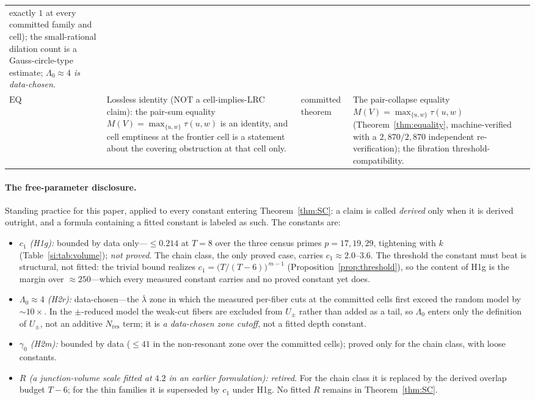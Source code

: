 \documentclass[11pt,a4paper]{article}
\numberwithin{equation}{section}
\theoremstyle{plain}
\theoremstyle{plain}
\theoremstyle{definition}
\theoremstyle{remark}
\begin{document}
{\begin{longtable}{@{}p{}p{}
                   p{}p{}@{}}
exactly $1$ at every committed family and cell); the small-rational
dilation count is a Gauss-circle-type estimate;
\emph{$\Lambda_0\approx 4$ is data-chosen}. \\
$\mathrm{EQ}$ &
Lossless identity (NOT a cell-implies-LRC claim): the pair-sum equality
$M(V)=\max_{\{u,w\}}\tau(u,w)$ is an identity, and cell emptiness at the
frontier cell is a statement about the covering obstruction at that cell
only. &
committed theorem &
The pair-collapse equality
$M(V)=\max_{\{u,w\}}\tau(u,w)$ (Theorem~\ref{thm:equality},
machine-verified with a $2{,}870/2{,}870$ independent re-verification);
the fibration threshold-compatibility. \\
\end{longtable}
}

\paragraph{The free-parameter disclosure.}
Standing practice for this paper, applied to every constant entering
Theorem~\ref{thm:SC}: a claim is called \emph{derived} only when it is
derived outright, and a formula containing a fitted constant is labeled
as such. The constants are:
\begin{itemize}[leftmargin=2.2em,itemsep=2pt,topsep=2pt]
\item \emph{$c_1$ (H1g):} bounded by data only---$\le 0.214$ at $T=8$
  over the three census primes $p=17,19,29$, tightening with $k$
  (Table~\ref{si:tab:volume}); \emph{not proved}. The chain class, the only
  proved case, carries $c_1\approx 2.0$--$3.6$. The threshold the
  constant must beat is structural, not fitted: the trivial bound
  realizes $c_1=\bigl(T/(T-6)\bigr)^{\,m-1}$
  (Proposition~\ref{prop:threshold}), so the content of H1g is the
  margin over $\approx250$---which every measured constant carries and
  no proved constant yet does.
\item \emph{$\Lambda_0\approx 4$ (H2r):} data-chosen---the $\bar\lambda$ zone in
which the measured per-fiber cuts at the committed cells first exceed the random
model by $\sim 10\times$. In the $\pm$-reduced model the weak-cut fibers are
excluded from $U_\pm$ rather than added as a tail, so $\Lambda_0$ enters only
the definition of $U_\pm$, not an additive $N_{\mathrm{res}}$ term; it is
\emph{a data-chosen zone cutoff}, not a fitted depth constant.
\item \emph{$\gamma_0$ (H2m):} bounded by data ($\le 41$ in the
  non-resonant zone over the committed cells); proved only for the chain
  class, with loose constants.
\item \emph{$R$ (a junction-volume scale fitted at $4.2$ in an earlier
  formulation):} \emph{retired}. For the chain class it is replaced by
  the derived overlap budget $T-6$; for the thin families it is
  superseded by $c_1$ under H1g. No fitted $R$ remains in
  Theorem~\ref{thm:SC}.
\end{itemize}
\end{document}
